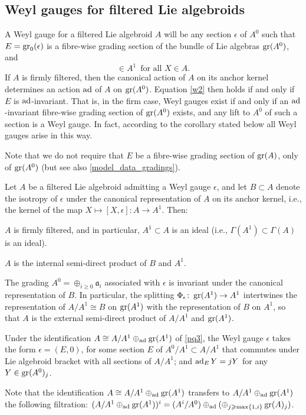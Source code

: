 \documentclass[leqno,12pt]{amsart} %
\begin{document}
\subsection{Weyl gauges for filtered Lie algebroids}\label{weyl}
A {\df Weyl gauge} for a filtered Lie algebroid $A$ will be any section $\epsilon$ of
$A^0$ such that $E = \operatorname{\operatorname{gr}}_0(\epsilon)$ is a fibre-wise grading section of the bundle of
Lie algebras $\operatorname{\operatorname{gr}}(A^0)$, and
\begin{equation}
  [X, \epsilon] \in A^1 \enspace\text{for all $X \in A$.}\label{w2}
\end{equation}
If $A$ is firmly filtered, then the canonical action of $A$ on its anchor kernel
determines an action $\operatorname{ad}$ of $A$ on $\operatorname{\operatorname{gr}}(A^0)$.  Equation \eqref{w2} then holds
if and only if $E$ is $\operatorname{ad}$-invariant. That is, in the firm case, Weyl gauges exist
if and only if an $\operatorname{ad}$-invariant fibre-wise grading section of $\operatorname{\operatorname{gr}}(A^0)$
exists, and any lift to $A^0$ of such a section is a Weyl gauge. In fact, according to the
corollary stated below all Weyl gauges arise in this way.

Note that we do not require that $E$ be a fibre-wise grading section of
$\operatorname{\operatorname{gr}}(A)$, only of $\operatorname{\operatorname{gr}}(A^0)$ (but see also \ref{model_data_gradings}).

\begin{theorem}
  Let $A$ be a filtered Lie algebroid admitting a Weyl gauge $\epsilon$, and let $B \subset A$
  denote the isotropy of $\epsilon$ under the canonical representation of $A$ on its anchor
  kernel, i.e., the kernel of the map
  $X \mapsto [X, \epsilon] \colon A \rightarrow A^1$. Then:
  \begin{conditions}
  \item $A$ is firmly filtered, and in particular, $A^1 \subset A$ is an ideal (i.e.,
    $\Gamma(A^1) \subset \Gamma(A)$ is an ideal).\label{pq1}
  \item $A$ is the internal semi-direct product of $B$ and $A^1$.\label{pq2}
  \item The grading $A^0=\oplus_{i\ge0}{\mathfrak a}_i$ associated with $\epsilon$ is
    invariant under the canonical representation of $B$. In particular, the splitting
    $\Phi_\epsilon \colon \operatorname{\operatorname{gr}}(A^1)\rightarrow A^1$ intertwines the representation of
    $A/A^1\cong B$ on $\operatorname{\operatorname{gr}}(A^1)$ with the representation of $B$ on $A^1$, so that $A$
    is the external semi-direct product of $A/A^1$ and $\operatorname{\operatorname{gr}}(A^1)$.\label{pq3}
  \item Under the identification $A \cong A/A^1 \oplus_{\operatorname{ad}}\operatorname{\operatorname{gr}}(A^1)$ of
    \eqref{pq3}, the Weyl gauge $\epsilon$ takes the form $\epsilon=(E,0)$, for some section $E$ of
    $A^0/A^1 \subset A/A^1$ that commutes under Lie algebroid bracket with all
    sections of $A/A^1$; and $\operatorname{ad}_EY = jY$ for any $Y \in \operatorname{\operatorname{gr}}(A^0)_j$.\label{pq4}
  \end{conditions}
\end{theorem}
\noindent%
Note that the identification $A \cong A/A^1 \oplus_{\operatorname{ad}}\operatorname{\operatorname{gr}}(A^1)$ transfers to
$A/A^1 \oplus_{\operatorname{ad}}\operatorname{\operatorname{gr}}(A^1)$ the following filtration:
$(A/A^1 \oplus_{\operatorname{ad}}\operatorname{\operatorname{gr}}(A^1))^i= (A^i/A^0)
\oplus_{\operatorname{ad}}(\oplus_{j\geqslant\max\{1,i\}}\operatorname{\operatorname{gr}}(A)_j)$.
\end{document}
